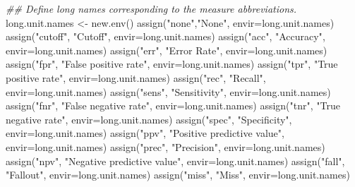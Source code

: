 \documentclass[
  letterpaper,
  DIV=11,
  numbers=noendperiod]{scrartcl}
\newenvironment{Shaded}{\begin{snugshade}}{\end{snugshade}}
\newcommand{\AttributeTok}[1]{\textcolor[rgb]{0.40,0.45,0.13}{#1}}
\newcommand{\DocumentationTok}[1]{\textcolor[rgb]{0.37,0.37,0.37}{\textit{#1}}}
\newcommand{\FunctionTok}[1]{\textcolor[rgb]{0.28,0.35,0.67}{#1}}
\newcommand{\NormalTok}[1]{\textcolor[rgb]{0.00,0.23,0.31}{#1}}
\newcommand{\OtherTok}[1]{\textcolor[rgb]{0.00,0.23,0.31}{#1}}
\newcommand{\StringTok}[1]{\textcolor[rgb]{0.13,0.47,0.30}{#1}}
\begin{document}
\begin{Shaded}
\begin{Highlighting}[]
    \DocumentationTok{\#\# Define long names corresponding to the measure abbreviations.}
\NormalTok{    long.unit.names }\OtherTok{\textless{}{-}} \FunctionTok{new.env}\NormalTok{()}
    \FunctionTok{assign}\NormalTok{(}\StringTok{"none"}\NormalTok{,}\StringTok{"None"}\NormalTok{, }\AttributeTok{envir=}\NormalTok{long.unit.names)}
    \FunctionTok{assign}\NormalTok{(}\StringTok{"cutoff"}\NormalTok{, }\StringTok{"Cutoff"}\NormalTok{, }\AttributeTok{envir=}\NormalTok{long.unit.names)}
    \FunctionTok{assign}\NormalTok{(}\StringTok{"acc"}\NormalTok{, }\StringTok{"Accuracy"}\NormalTok{, }\AttributeTok{envir=}\NormalTok{long.unit.names)}
    \FunctionTok{assign}\NormalTok{(}\StringTok{"err"}\NormalTok{, }\StringTok{"Error Rate"}\NormalTok{, }\AttributeTok{envir=}\NormalTok{long.unit.names)}
    \FunctionTok{assign}\NormalTok{(}\StringTok{"fpr"}\NormalTok{, }\StringTok{"False positive rate"}\NormalTok{, }\AttributeTok{envir=}\NormalTok{long.unit.names)}
    \FunctionTok{assign}\NormalTok{(}\StringTok{"tpr"}\NormalTok{, }\StringTok{"True positive rate"}\NormalTok{, }\AttributeTok{envir=}\NormalTok{long.unit.names)}
    \FunctionTok{assign}\NormalTok{(}\StringTok{"rec"}\NormalTok{, }\StringTok{"Recall"}\NormalTok{, }\AttributeTok{envir=}\NormalTok{long.unit.names)}
    \FunctionTok{assign}\NormalTok{(}\StringTok{"sens"}\NormalTok{, }\StringTok{"Sensitivity"}\NormalTok{, }\AttributeTok{envir=}\NormalTok{long.unit.names)}
    \FunctionTok{assign}\NormalTok{(}\StringTok{"fnr"}\NormalTok{, }\StringTok{"False negative rate"}\NormalTok{, }\AttributeTok{envir=}\NormalTok{long.unit.names)}
    \FunctionTok{assign}\NormalTok{(}\StringTok{"tnr"}\NormalTok{, }\StringTok{"True negative rate"}\NormalTok{, }\AttributeTok{envir=}\NormalTok{long.unit.names)}
    \FunctionTok{assign}\NormalTok{(}\StringTok{"spec"}\NormalTok{, }\StringTok{"Specificity"}\NormalTok{, }\AttributeTok{envir=}\NormalTok{long.unit.names)}
    \FunctionTok{assign}\NormalTok{(}\StringTok{"ppv"}\NormalTok{, }\StringTok{"Positive predictive value"}\NormalTok{, }\AttributeTok{envir=}\NormalTok{long.unit.names)}
    \FunctionTok{assign}\NormalTok{(}\StringTok{"prec"}\NormalTok{, }\StringTok{"Precision"}\NormalTok{, }\AttributeTok{envir=}\NormalTok{long.unit.names)}
    \FunctionTok{assign}\NormalTok{(}\StringTok{"npv"}\NormalTok{, }\StringTok{"Negative predictive value"}\NormalTok{, }\AttributeTok{envir=}\NormalTok{long.unit.names)}
    \FunctionTok{assign}\NormalTok{(}\StringTok{"fall"}\NormalTok{, }\StringTok{"Fallout"}\NormalTok{, }\AttributeTok{envir=}\NormalTok{long.unit.names)}
    \FunctionTok{assign}\NormalTok{(}\StringTok{"miss"}\NormalTok{, }\StringTok{"Miss"}\NormalTok{, }\AttributeTok{envir=}\NormalTok{long.unit.names)}

\end{Highlighting}
\end{Shaded}
\end{document}
